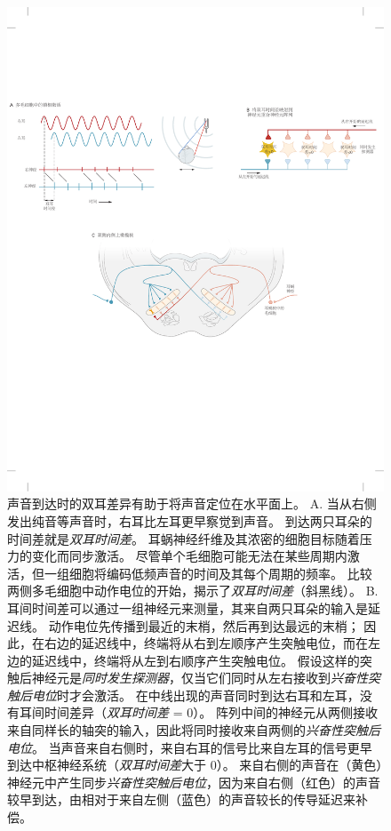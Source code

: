 \begin{figure}[htbp]
	\centering
	\includegraphics[width=0.9\linewidth]{chap28/fig_28_5}
	\caption{声音到达时的双耳差异有助于将声音定位在水平面上。
		A. 当从右侧发出纯音等声音时，右耳比左耳更早察觉到声音。 
		到达两只耳朵的时间差就是\textit{双耳时间差}。 
		耳蜗神经纤维及其浓密的细胞目标随着压力的变化而同步激活。
		尽管单个毛细胞可能无法在某些周期内激活，但一组细胞将编码低频声音的时间及其每个周期的频率。 
		比较两侧多毛细胞中动作电位的开始，揭示了\textit{双耳时间差}（斜黑线）。 
		B. 耳间时间差可以通过一组神经元来测量，其来自两只耳朵的输入是延迟线\cite{jeffress1948place}。
		动作电位先传播到最近的末梢，然后再到达最远的末梢；
		因此，在右边的延迟线中，终端将从右到左顺序产生突触电位，而在左边的延迟线中，终端将从左到右顺序产生突触电位。
		假设这样的突触后神经元是\textit{同时发生探测器}，仅当它们同时从左右接收到\textit{兴奋性突触后电位}时才会激活。
		在中线出现的声音同时到达右耳和左耳，没有耳间时间差异（\textit{双耳时间差} = 0）。
		阵列中间的神经元从两侧接收来自同样长的轴突的输入，因此将同时接收来自两侧的\textit{兴奋性突触后电位}。
		当声音来自右侧时，来自右耳的信号比来自左耳的信号更早到达中枢神经系统（\textit{双耳时间差}大于 0）。
		来自右侧的声音在（黄色）神经元中产生同步\textit{兴奋性突触后电位}，因为来自右侧（红色）的声音较早到达，由相对于来自左侧（蓝色）的声音较长的传导延迟来补偿。
}
\end{figure}
